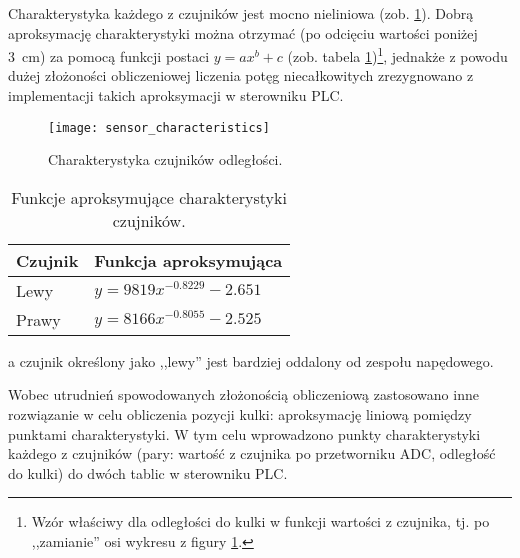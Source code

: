 Charakterystyka każdego z czujników jest mocno nieliniowa (zob. \cref{fig:charakterystyka_czujnikow}). Dobrą aproksymację charakterystyki można otrzymać (po odcięciu wartości poniżej \SI{3}{\centi\meter}) za pomocą funkcji postaci $y = a x ^ b + c$ (zob. tabela \ref{tab:aproksymacja_czujnikow})\footnote{Wzór właściwy dla odległości do kulki w funkcji wartości z czujnika, tj. po ,,zamianie'' osi wykresu z figury \ref{fig:charakterystyka_czujnikow}.}, jednakże z powodu dużej złożoności obliczeniowej liczenia potęg niecałkowitych zrezygnowano z implementacji takich aproksymacji w sterowniku PLC.

\begin{figure}[h]
    \centering
    \texttt{[image: sensor\_characteristics]}
    \caption{Charakterystyka czujników odległości.}
    \label{fig:charakterystyka_czujnikow}
\end{figure}

\begin{table}[h]
    \centering
    \begin{threeparttable}
        \caption{Funkcje aproksymujące charakterystyki czujników.}
        \label{tab:aproksymacja_czujnikow}
        
        \begin{tabularx}{0.4\textwidth}{l | l}
            \toprule
            Czujnik & Funkcja aproksymująca \\
            \midrule
            Lewy\tnote{a}  & $y = 9819 x ^ {-0.8229} - 2.651 $ \\
            Prawy\tnote{a} & $y = 8166 x ^ {-0.8055} - 2.525 $ \\
            \bottomrule
        \end{tabularx}
        
        \begin{tablenotes}
            \footnotesize
            \item[a] czujnik określony jako ,,lewy'' jest bardziej oddalony od zespołu napędowego.
        \end{tablenotes}
    \end{threeparttable}
\end{table}

Wobec utrudnień spowodowanych złożonością obliczeniową zastosowano inne rozwiązanie w celu obliczenia pozycji kulki: aproksymację liniową pomiędzy punktami charakterystyki. W tym celu wprowadzono punkty charakterystyki każdego z czujników (pary: wartość z czujnika po przetworniku ADC, odległość do kulki) do dwóch tablic w sterowniku PLC.

